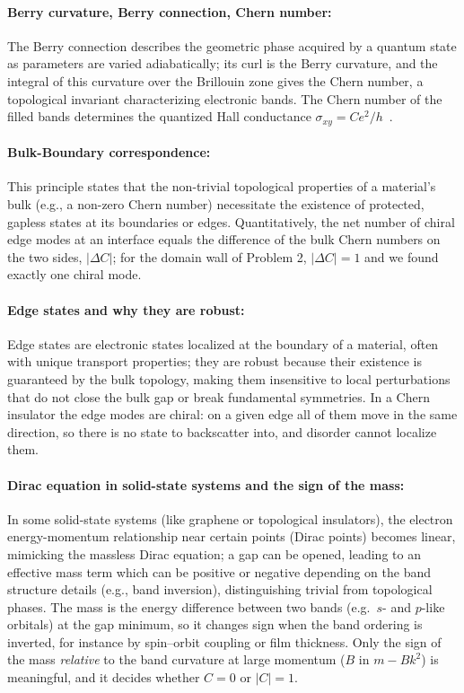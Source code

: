 \documentclass{article}
\begin{document}
    \paragraph{Berry curvature, Berry connection, Chern number:} The Berry connection describes the geometric phase acquired by a quantum state as parameters are varied adiabatically; its curl is the Berry curvature, and the integral of this curvature over the Brillouin zone gives the Chern number, a topological invariant characterizing electronic bands. The Chern number of the filled bands determines the quantized Hall conductance $\sigma_{xy} = C e^2/h$~\cite{TKNN, XCN}.

    \paragraph{Bulk-Boundary correspondence:} This principle states that the non-trivial topological properties of a material's bulk (e.g., a non-zero Chern number) necessitate the existence of protected, gapless states at its boundaries or edges. Quantitatively, the net number of chiral edge modes at an interface equals the difference of the bulk Chern numbers on the two sides, $|\Delta C|$; for the domain wall of Problem 2, $|\Delta C| = 1$ and we found exactly one chiral mode.

    \paragraph{Edge states and why they are robust:} Edge states are electronic states localized at the boundary of a material, often with unique transport properties; they are robust because their existence is guaranteed by the bulk topology, making them insensitive to local perturbations that do not close the bulk gap or break fundamental symmetries. In a Chern insulator the edge modes are chiral: on a given edge all of them move in the same direction, so there is no state to backscatter into, and disorder cannot localize them.

    \paragraph{Dirac equation in solid-state systems and the sign of the mass:} In some solid-state systems (like graphene or topological insulators), the electron energy-momentum relationship near certain points (Dirac points) becomes linear, mimicking the massless Dirac equation; a gap can be opened, leading to an effective mass term which can be positive or negative depending on the band structure details (e.g., band inversion), distinguishing trivial from topological phases. The mass is the energy difference between two bands (e.g.\ $s$- and $p$-like orbitals) at the gap minimum, so it changes sign when the band ordering is inverted, for instance by spin--orbit coupling or film thickness. Only the sign of the mass \emph{relative} to the band curvature at large momentum ($B$ in $m - Bk^2$) is meaningful, and it decides whether $C=0$ or $|C|=1$.
\end{document}
